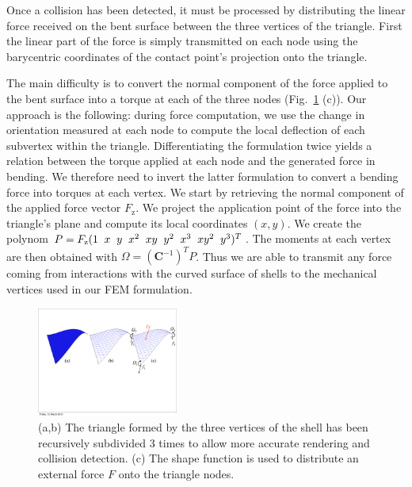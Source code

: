 \documentclass{llncs}
\begin{document}
Once a collision has been detected, it must be processed by distributing the linear force received on the bent surface between the three vertices of the triangle. First the linear part of the force is simply transmitted on each node using the barycentric coordinates of the contact point's projection onto the triangle. 

The main difficulty is to convert the normal component of the force applied to the bent surface into a torque at each of the three nodes (Fig.~\ref{fig-shell} (c)). Our approach is the following: during force computation, we use the change in orientation measured at each node to compute the local deflection of each subvertex within the triangle. Differentiating the formulation twice yields a relation between the torque applied at each node and the generated force in bending. We therefore need to invert the latter formulation to convert a bending force into torques at each vertex. We start by retrieving the normal component of the applied force vector $F_{\mathrm{z}}$. We project the application point of the force into the triangle's plane and compute its local coordinates $(x,y)$. We create the polynom $P = F_{\mathrm{z}}(1 \hspace{0.2cm} x \hspace{0.2cm} y \hspace{0.2cm} x^2 \hspace{0.2cm} xy \hspace{0.2cm} y^2 \hspace{0.2cm} x^3 \hspace{0.2cm} xy^2 \hspace{0.2cm} y^3)^T$. The moments at each vertex are then obtained with $\Omega = (\textbf{C}^{-1})^T P$.  Thus we are able to transmit any force coming from interactions with the curved surface of shells to the mechanical vertices used in our FEM formulation. 

\begin{figure}
\centering
\includegraphics[height=3.6cm]{images/shell_curvature.pdf}
\caption {(a,b)  The triangle formed by the three vertices of the shell has been recursively subdivided 3 times to allow more accurate rendering and collision detection. (c) The shape function is used to distribute an external force $F$ onto the triangle nodes.}
\label{fig-shell}
\end{figure}
\end{document}
